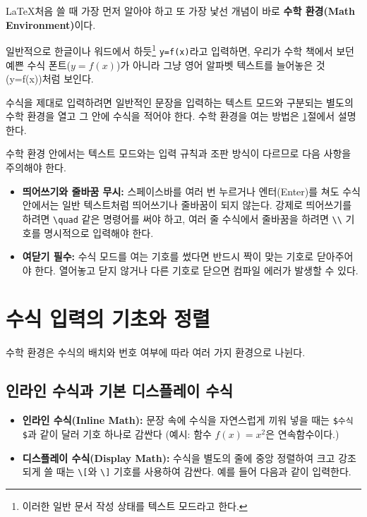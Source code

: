 \documentclass[11pt, a4paper]{article}
\theoremstyle{plain}
\theoremstyle{definition}
\theoremstyle{remark}
\begin{document}
\LaTeX\을 처음 쓸 때 가장 먼저 알아야 하고 또 가장 낯선 개념이 바로 \textbf{수학 환경(Math Environment)}이다.

일반적으로 한글이나 워드에서 하듯\footnote{이러한 일반 문서 작성 상태를 텍스트 모드라고 한다.}
\verb|y=f(x)|라고 입력하면, 우리가 수학 책에서 보던 예쁜 수식 폰트($y=f(x)$)가 아니라 그냥 영어 알파벳 텍스트를 늘어놓은 것(y=f(x))처럼 보인다.

수식을 제대로 입력하려면 일반적인 문장을 입력하는 텍스트 모드와 구분되는 별도의 수학 환경을 열고 그 안에 수식을 적어야 한다. 수학 환경을 여는 방법은 \ref{WritingMath}절에서 설명한다.

수학 환경 안에서는 텍스트 모드와는 입력 규칙과 조판 방식이 다르므로 다음 사항을 주의해야 한다.
\begin{itemize}
    \item \textbf{띄어쓰기와 줄바꿈 무시:}
    스페이스바를 여러 번 누르거나 엔터(Enter)를 쳐도 수식 안에서는 일반 텍스트처럼 띄어쓰기나 줄바꿈이 되지 않는다. 강제로 띄어쓰기를 하려면 \verb|\quad| 같은 명령어를 써야 하고, 여러 줄 수식에서 줄바꿈을 하려면 \verb|\\| 기호를 명시적으로 입력해야 한다.

    \item \textbf{여닫기 필수:}
    수식 모드를 여는 기호를 썼다면 반드시 짝이 맞는 기호로 닫아주어야 한다. 열어놓고 닫지 않거나 다른 기호로 닫으면 컴파일 에러가 발생할 수 있다.
\end{itemize}

\section{수식 입력의 기초와 정렬}\label{WritingMath}

수학 환경은 수식의 배치와 번호 여부에 따라 여러 가지 환경으로 나뉜다.

\subsection{인라인 수식과 기본 디스플레이 수식}

\begin{itemize}
    \item \textbf{인라인 수식(Inline Math):}
    문장 속에 수식을 자연스럽게 끼워 넣을 때는 \verb|$수식$|과 같이 달러 기호 하나로 감싼다 (예시: 함수 $f(x) = x^2$은 연속함수이다.)

    \item \textbf{디스플레이 수식(Display Math):}
    수식을 별도의 줄에 중앙 정렬하여 크고 강조되게 쓸 때는 \verb|\[|와 \verb|\]| 기호를 사용하여 감싼다. 예를 들어 다음과 같이 입력한다.
\end{itemize}
\end{document}
